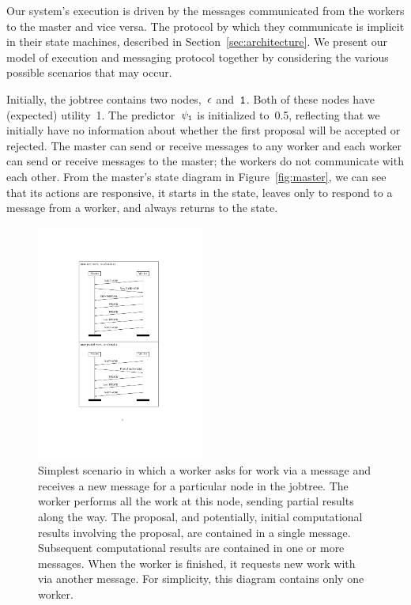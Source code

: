 \documentclass[angelino.tex]{subfiles}
\begin{document}
Our system's execution is driven by the messages communicated from the workers
to the master and vice versa.
%
The protocol by which they communicate is implicit in their state machines,
described in Section~\ref{sec:architecture}.
%
We present our model of execution and messaging protocol together
by considering the various possible scenarios that may occur.

%

Initially, the jobtree contains two nodes,~$\epsilon$ and~$\texttt{1}$.
%
Both of these nodes have (expected) utility~1.
%
The predictor~$\psi_{\texttt{1}}$ is initialized to~0.5, reflecting that we
initially have no information about whether the first proposal will be accepted
or rejected.
%
The master can send or receive messages to any worker
and each worker can send or receive messages to the master;
the workers do not communicate with each other.
%
From the master's state diagram in Figure~\ref{fig:master}, we can see that its
actions are responsive, \ie it starts in the \wait state, leaves only to
respond to a message from a worker, and always returns to the \wait state.


\begin{figure}[t]
\centering
\includegraphics[width=0.49\textwidth]{figs/protocol/new-work.pdf}
\caption{Simplest scenario in which a worker asks for work via a \WANTWORK
message and receives a new \HAVEWORK message for a particular node in the jobtree.
The worker performs all the work at this node, sending partial results along the way.
The proposal, and potentially, initial computational results involving the proposal,
are contained in a single \SETPROPOSAL message.
Subsequent computational results are contained in one or more \UPDATE messages.
When the worker is finished, it requests new work with via another \WANTWORK message.
For simplicity, this diagram contains only one worker.}
\label{fig:new-work}
\end{figure}
\end{document}
